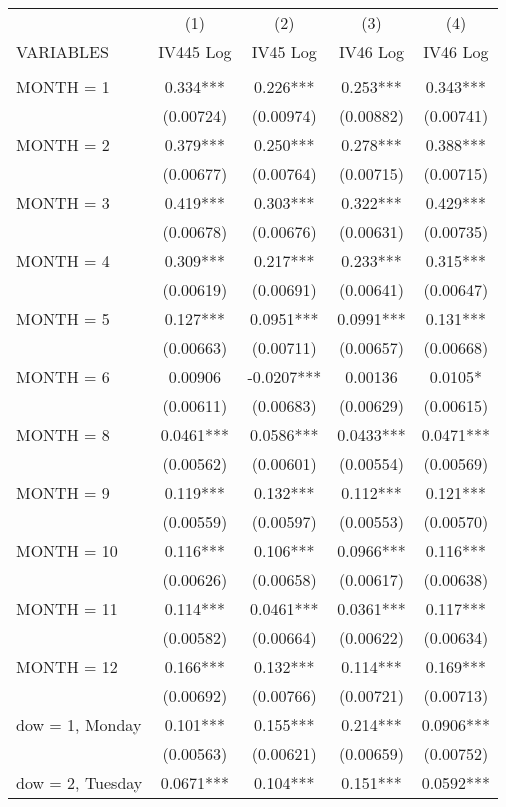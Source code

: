 \begin{tabular}{lcccc} \hline
 & (1) & (2) & (3) & (4) \\
VARIABLES & IV445 Log & IV45 Log & IV46 Log & IV46 Log \\ \hline
 &  &  &  &  \\
MONTH = 1 & 0.334*** & 0.226*** & 0.253*** & 0.343*** \\
 & (0.00724) & (0.00974) & (0.00882) & (0.00741) \\
MONTH = 2 & 0.379*** & 0.250*** & 0.278*** & 0.388*** \\
 & (0.00677) & (0.00764) & (0.00715) & (0.00715) \\
MONTH = 3 & 0.419*** & 0.303*** & 0.322*** & 0.429*** \\
 & (0.00678) & (0.00676) & (0.00631) & (0.00735) \\
MONTH = 4 & 0.309*** & 0.217*** & 0.233*** & 0.315*** \\
 & (0.00619) & (0.00691) & (0.00641) & (0.00647) \\
MONTH = 5 & 0.127*** & 0.0951*** & 0.0991*** & 0.131*** \\
 & (0.00663) & (0.00711) & (0.00657) & (0.00668) \\
MONTH = 6 & 0.00906 & -0.0207*** & 0.00136 & 0.0105* \\
 & (0.00611) & (0.00683) & (0.00629) & (0.00615) \\
MONTH = 8 & 0.0461*** & 0.0586*** & 0.0433*** & 0.0471*** \\
 & (0.00562) & (0.00601) & (0.00554) & (0.00569) \\
MONTH = 9 & 0.119*** & 0.132*** & 0.112*** & 0.121*** \\
 & (0.00559) & (0.00597) & (0.00553) & (0.00570) \\
MONTH = 10 & 0.116*** & 0.106*** & 0.0966*** & 0.116*** \\
 & (0.00626) & (0.00658) & (0.00617) & (0.00638) \\
MONTH = 11 & 0.114*** & 0.0461*** & 0.0361*** & 0.117*** \\
 & (0.00582) & (0.00664) & (0.00622) & (0.00634) \\
MONTH = 12 & 0.166*** & 0.132*** & 0.114*** & 0.169*** \\
 & (0.00692) & (0.00766) & (0.00721) & (0.00713) \\
dow = 1, Monday & 0.101*** & 0.155*** & 0.214*** & 0.0906*** \\
 & (0.00563) & (0.00621) & (0.00659) & (0.00752) \\
dow = 2, Tuesday & 0.0671*** & 0.104*** & 0.151*** & 0.0592*** \\

\end{tabular}
